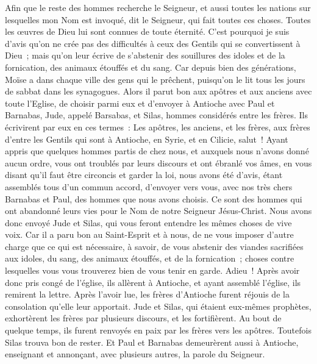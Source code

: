 \begin{multicols}{2}
Afin que le reste des hommes recherche le Seigneur, et aussi toutes les nations sur lesquelles mon Nom est invoqué, dit le Seigneur, qui fait toutes ces choses.
Toutes les œuvres de Dieu lui sont connues de toute éternité.
C'est pourquoi je suis d'avis qu'on ne crée pas des difficultés à ceux des Gentils qui se convertissent à Dieu~;
mais qu'on leur écrive de s'abstenir des souillures des idoles et de la fornication, des animaux étouffés et du sang.
Car depuis bien des générations, Moïse a dans chaque ville des gens qui le prêchent, puisqu'on le lit tous les jours de sabbat dans les synagogues.
Alors il parut bon aux apôtres et aux anciens avec toute l'Eglise, de choisir parmi eux et d'envoyer à Antioche avec Paul et Barnabas, Jude, appelé Barsabas, et Silas, hommes considérés entre les frères.
Ils écrivirent par eux en ces termes~: Les apôtres, les anciens, et les frères, aux frères d'entre les Gentils qui sont à Antioche, en Syrie, et en Cilicie, salut~!
Ayant appris que quelques hommes partis de chez nous, et auxquels nous n'avons donné aucun ordre, vous ont troublés par leurs discours et ont ébranlé vos âmes, en vous disant qu'il faut être circoncis et garder la loi,
nous avons été d'avis, étant assemblés tous d'un commun accord, d'envoyer vers vous, avec nos très chers Barnabas et Paul, des hommes que nous avons choisis. 
Ce sont des hommes qui ont abandonné leurs vies pour le Nom de notre Seigneur Jésus-Christ.
Nous avons donc envoyé Jude et Silas, qui vous feront entendre les mêmes choses de vive voix.
Car il a paru bon au Saint-Esprit et à nous, de ne vous imposer d'autre charge que ce qui est nécessaire,
à savoir, de vous abstenir des viandes sacrifiées aux idoles, du sang, des animaux étouffés, et de la fornication~; choses contre lesquelles vous vous trouverez bien de vous tenir en garde. Adieu~!
Après avoir donc pris congé de l'église, ils allèrent à Antioche, et ayant assemblé l'église, ils remirent la lettre.
Après l'avoir lue, les frères d'Antioche furent réjouis de la consolation qu'elle leur apportait.
Jude et Silas, qui étaient eux-mêmes prophètes, exhortèrent les frères par plusieurs discours, et les fortifièrent.
Au bout de quelque temps, ils furent renvoyés en paix par les frères vers les apôtres.
Toutefois Silas trouva bon de rester.
Et Paul et Barnabas demeurèrent aussi à Antioche, enseignant et annonçant, avec plusieurs autres, la parole du Seigneur.

\end{multicols}
